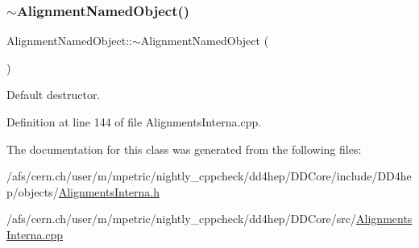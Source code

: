 \subsubsection{\texorpdfstring{$\sim$\+Alignment\+Named\+Object()}{~AlignmentNamedObject()}}
{\footnotesize\ttfamily Alignment\+Named\+Object\+::$\sim$\+Alignment\+Named\+Object (\begin{DoxyParamCaption}{ }\end{DoxyParamCaption})\hspace{0.3cm}{\ttfamily [virtual]}}



Default destructor. 



Definition at line 144 of file Alignments\+Interna.\+cpp.



The documentation for this class was generated from the following files\+:\begin{DoxyCompactItemize}
\item 
/afs/cern.\+ch/user/m/mpetric/nightly\+\_\+cppcheck/dd4hep/\+D\+D\+Core/include/\+D\+D4hep/objects/\hyperlink{_alignments_interna_8h}{Alignments\+Interna.\+h}\item 
/afs/cern.\+ch/user/m/mpetric/nightly\+\_\+cppcheck/dd4hep/\+D\+D\+Core/src/\hyperlink{_alignments_interna_8cpp}{Alignments\+Interna.\+cpp}\end{DoxyCompactItemize}
